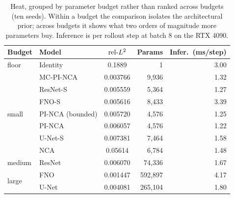 \begin{table}[t]
\centering
\caption{Heat, grouped by parameter budget rather than ranked across budgets (ten seeds).
Within a budget the comparison isolates the architectural prior; across budgets it shows
what two orders of magnitude more parameters buy. Inference is per rollout step at batch
8 on the RTX 4090.}
\label{tab:eff}
\small
\begin{tabular}{llcrr}
\toprule
Budget & Model & $\mathrm{rel}\mbox{-}L^2$ & Params & Infer.\ (ms/step) \\
\midrule
floor & Identity                  & 0.1889   & 1       & 3.00 \\
\midrule
\multirow{7}{*}{small}
 & MC-PI-NCA                      & 0.003766 & 9{,}936 & 1.32 \\
 & ResNet-S                       & 0.005559 & 5{,}364 & 1.27 \\
 & FNO-S                          & 0.005616 & 8{,}433 & 3.39 \\
 & PI-NCA (bounded)               & 0.005720 & 4{,}576 & 1.25 \\
 & PI-NCA                         & 0.006057 & 4{,}576 & 1.22 \\
 & U-Net-S                        & 0.007381 & 7{,}464 & 1.58 \\
 & NCA                            & 0.05614  & 6{,}784 & 1.48 \\
\midrule
medium & ResNet                   & 0.006070 & 74{,}336 & 1.67 \\
\midrule
\multirow{2}{*}{large}
 & FNO                            & 0.001447 & 592{,}897 & 4.17 \\
 & U-Net                          & 0.004081 & 265{,}104 & 1.80 \\
\bottomrule
\end{tabular}
\end{table}
